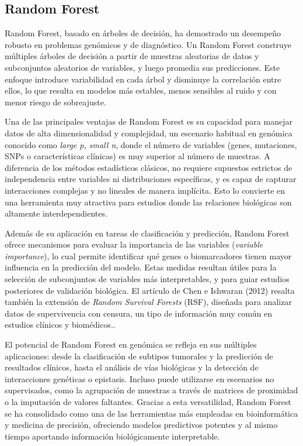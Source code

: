 \documentclass[11pt,a4paper,spanish]{book}
\numberwithin{equation}{chapter}
\numberwithin{figure}{chapter}
\begin{document}
\subsection{Random Forest}

Random Forest, basado en árboles de decisión, ha demostrado un desempeño robusto en problemas genómicos y de diagnóstico\cite{Breiman2001,CHEN2012}. Un Random Forest construye múltiples árboles de decisión a partir de muestras aleatorias de datos y subconjuntos aleatorios de variables, y luego promedia sus predicciones. Este enfoque introduce variabilidad en cada árbol y disminuye la correlación entre ellos, lo que resulta en modelos más estables, menos sensibles al ruido y con menor riesgo de sobreajuste. 

Una de las principales ventajas de Random Forest es su capacidad para manejar datos de alta dimensionalidad y complejidad, un escenario habitual en genómica conocido como \textit{large p, small n}, donde el número de variables (genes, mutaciones, SNPs o características clínicas) es muy superior al número de muestras. A diferencia de los métodos estadísticos clásicos, no requiere supuestos estrictos de independencia entre variables ni distribuciones específicas, y es capaz de capturar interacciones complejas y no lineales de manera implícita. Esto lo convierte en una herramienta muy atractiva para estudios donde las relaciones biológicas son altamente interdependientes. \cite{CHEN2012}

Además de su aplicación en tareas de clasificación y predicción, Random Forest ofrece mecanismos para evaluar la importancia de las variables (\textit{variable importance}), lo cual permite identificar qué genes o biomarcadores tienen mayor influencia en la predicción del modelo. Estas medidas resultan útiles para la selección de subconjuntos de variables más interpretables, y para guiar estudios posteriores de validación biológica. El artículo de Chen e Ishwaran (2012) resalta también la extensión de \textit{Random Survival Forests} (RSF), diseñada para analizar datos de supervivencia con censura, un tipo de información muy común en estudios clínicos y biomédicos\cite{CHEN2012,Ishwaran2008}..  

El potencial de Random Forest en genómica se refleja en sus múltiples aplicaciones: desde la clasificación de subtipos tumorales y la predicción de resultados clínicos, hasta el análisis de vías biológicas y la detección de interacciones genéticas o epistasis. Incluso puede utilizarse en escenarios no supervisados, como la agrupación de muestras a través de matrices de proximidad o la imputación de valores faltantes. Gracias a esta versatilidad, Random Forest se ha consolidado como una de las herramientas más empleadas en bioinformática y medicina de precisión, ofreciendo modelos predictivos potentes y al mismo tiempo aportando información biológicamente interpretable\cite{CHEN2012,Libbrecht2015,qi2012}.
\end{document}
